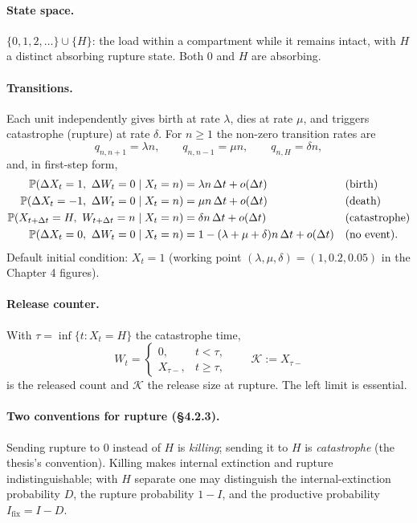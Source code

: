 \documentclass[11pt,a4paper]{report}
\newcommand{\pr}[1]{\mathbb{P}\!\left(#1\right)}
\newcommand{\Ifix}{I_{\mathrm{fix}}}
\newcommand{\Kr}{\mathcal{K}}      %
\newcommand{\Xt}{X_t}
\newcommand{\Wt}{W_t}
\begin{document}
\paragraph{State space.} $\{0,1,2,\ldots\}\cup\{H\}$: the load within a
compartment while it remains intact, with $H$ a distinct absorbing rupture
state. Both $0$ and $H$ are absorbing.

\paragraph{Transitions.} Each unit independently gives birth at rate
$\lambda$, dies at rate $\mu$, and triggers catastrophe (rupture) at rate
$\delta$. For $n\ge1$ the non-zero transition rates are
\begin{equation}
q_{n,n+1}=\lambda n,
\qquad
q_{n,n-1}=\mu n,
\qquad
q_{n,H}=\delta n,
\end{equation}
and, in first-step form,
\begin{align}
\pr{\Delta \Xt = 1,\ \Delta \Wt = 0 \mid \Xt=n} &= \lambda n\,\Delta t+o(\Delta t)
&&\text{(birth)}\notag\\
\pr{\Delta \Xt = -1,\ \Delta \Wt = 0 \mid \Xt=n} &= \mu n\,\Delta t+o(\Delta t)
&&\text{(death)}\\
\pr{X_{t+\Delta t} = H,\ W_{t+\Delta t} = n \mid \Xt=n} &= \delta n\,\Delta t+o(\Delta t)
&&\text{(catastrophe)}\notag\\
\pr{\Delta \Xt = 0,\ \Delta \Wt = 0 \mid \Xt=n} &=
1-(\lambda+\mu+\delta)n\,\Delta t+o(\Delta t)
&&\text{(no event).}\notag
\end{align}
Default initial condition: $\Xt=1$ (working point
$(\lambda,\mu,\delta)=(1,0.2,0.05)$ in the Chapter 4 figures).

\paragraph{Release counter.} With
$\tau=\inf\{t:\Xt=H\}$ the catastrophe time,
\begin{equation}
\Wt=
\begin{cases}
0,&t<\tau,\\
X_{\tau-},&t\ge\tau,
\end{cases}
\qquad
\Kr:=X_{\tau-}
\end{equation}
is the released count and $\Kr$ the release size at rupture. The left limit
is essential.

\paragraph{Two conventions for rupture (\S4.2.3).} Sending rupture to $0$
instead of $H$ is \emph{killing}; sending it to $H$ is \emph{catastrophe}
(the thesis's convention). Killing makes internal extinction and rupture
indistinguishable; with $H$ separate one may distinguish the
internal-extinction probability $D$, the rupture probability $1-I$, and the
productive probability $\Ifix=I-D$.
\end{document}
